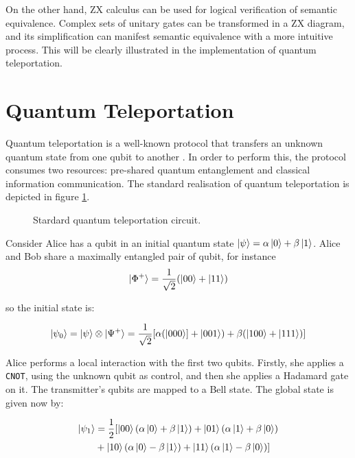 \documentclass[12pt, twoside, openany]{book}
\begin{document}
On the other hand, ZX calculus can be used for logical verification of semantic equivalence. Complex sets of unitary gates can be transformed in a ZX diagram, and its simplification can manifest semantic equivalence with a more intuitive process. This will be clearly illustrated in the implementation of quantum teleportation. \\

\section{Quantum Teleportation}

Quantum teleportation is a well-known protocol that transfers an unknown quantum state from one qubit to another \cite{NielsenChuang2010}. In order to perform this, the protocol consumes two resources: pre-shared quantum entanglement and classical information communication. The standard realisation of quantum teleportation is depicted in figure \ref{fig:teleportation_circuit}.

\begin{figure} [ht]
    \centering
    
    \caption{Stardard quantum teleportation circuit.}
    \label{fig:teleportation_circuit}
\end{figure}

Consider Alice has a qubit in an initial quantum state $\ket{\psi} = \alpha \ket{0} + \beta \ket{1}$. Alice and Bob share a maximally entangled pair of qubit, for instance 
\begin{align*}
    \ket{\Phi ^+} = \frac{1}{\sqrt{2}}(\ket{00} + \ket{11})
\end{align*}

so the initial state is:

\begin{align*}
    \ket{\psi _0} = \ket{\psi} \otimes \ket{\Psi ^+} = \frac{1}{\sqrt{2}} [\alpha (\ket{000}] + \ket{001}) + \beta (\ket{100} + \ket{111})]
\end{align*}

Alice performs a local interaction with the first two qubits. Firstly, she applies a \texttt{CNOT}, using the unknown qubit as control, and then she applies a Hadamard gate on it. The transmitter's qubits are mapped to a Bell state. The global state is given now by:

\begin{align*}
    \ket{\psi_1} &= \frac{1}{2} [ \ket{00}(\alpha\ket{0} + \beta\ket{1}) + \ket{01}(\alpha\ket{1} + \beta\ket{0}) \\
    &+ \ket{10}(\alpha\ket{0} - \beta\ket{1}) + \ket{11}(\alpha\ket{1} - \beta\ket{0}) ]
\end{align*}
\end{document}
